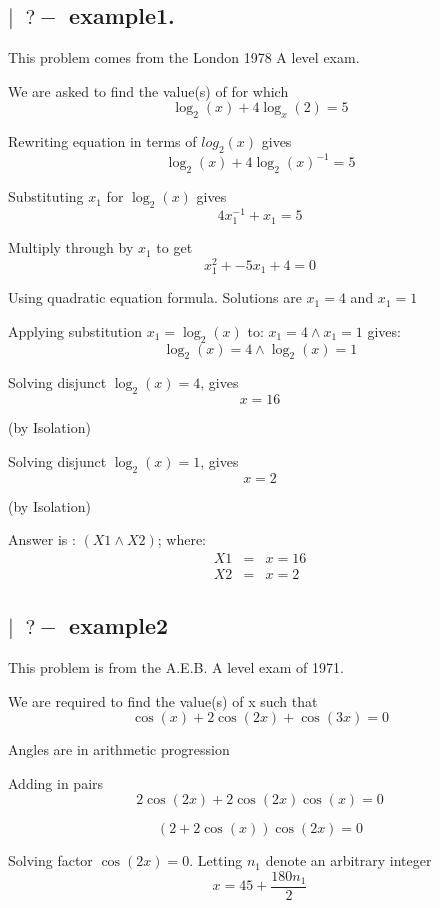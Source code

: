 
\LARGE

\subsection*{$\mid\;\;?-$ example1.}
This problem comes from the London 1978 A level exam.

We are asked to find the value(s) of for which
\[	\log_2(x) + 4\log_x(2) = 5\]


Rewriting equation in terms of $log_2(x)$ gives 
\[\log_2(x) + 4\log_2(x)^{-1} = 5\]

Substituting $x_1$ for $\log_2(x)$ gives
\[ 4x_1^{-1} + x_1 = 5\]

Multiply through by $x_1$ to get 
\[x_1^2 + -5x_1 + 4 = 0\]

Using quadratic equation formula. Solutions are $x_1 = 4$ and $x_1 = 1$

Applying substitution $x_1 = \log_2(x)$ to: $x_1 = 4\wedge x_1 = 1$ gives: 
\[    \log_2(x) = 4 \wedge \log_2(x) = 1\]

Solving disjunct $\log_2(x) = 4$, gives
\[    x = 16\]

(by Isolation)

Solving disjunct $\log_2(x) = 1$, gives
\[    x = 2\]

(by Isolation)

\vspace*{.25in}
Answer is : $(X1 \wedge X2)$; where: 
\begin{eqnarray*}
X1 & = & x = 16\\
X2 & = &  x = 2
\end{eqnarray*}

\newpage
\subsection*{$\mid\;\; ?-$ example2}

This problem is from the A.E.B. A level exam of 1971.

We are required to find the value(s) of x such that
\[	\cos(x) + 2\cos(2x) + \cos(3x) = 0\]

Angles are in arithmetic progression 

Adding in pairs
\[2\cos(2x) + 2\cos(2x)\cos(x) = 0\]

\[(2 + 2\cos(x))\cos(2x) = 0\]

Solving factor $\cos(2x) = 0$. Letting $n_1$ denote an arbitrary integer
\[x = 45 +\frac{180n_1}{2}\]


